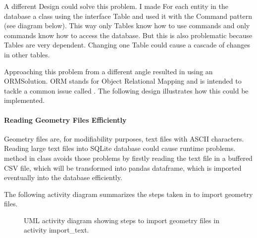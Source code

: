 \documentclass[letterpaper,10pt,english]{sphinxmanual}
\begin{document}
A different Design could solve this problem. I made For each entity in the database a class using the interface Table and used it with the Command pattern (see diagram below). This way only Tables know how to use commands and only commands know how to access the database. But this is also problematic because Tables are very dependent. Changing one Table could cause a cascade of changes in other tables.

\begin{figure}[htbp]
\centering

\noindent{}
\end{figure}

Approaching this problem from a different angle resulted in using an ORM\sphinxhyphen{}Solution. ORM stands for Object Relational Mapping and is intended to tackle a common issue called .
The following design illustrates how this could be implemented.

\begin{figure}[htbp]
\centering

\noindent{}
\end{figure}


\paragraph{Reading Geometry Files Efficiently}
\label{\detokenize{implementation:reading-geometry-files-efficiently}}
Geometry files are, for modifiability purposes, text files with ASCII characters.
Reading large text files into SQLite database could cause run\sphinxhyphen{}time problems.
 method in  class avoids those problems by firstly reading the text file in a buffered CSV file,
which will be transformed into pandas dataframe, which is imported eventually into the database efficiently.

The following activity diagram summarizes the steps taken in  to import geometry files.

\begin{figure}[htbp]
\centering
\capstart

\noindent{}
\caption{UML activity diagram showing steps to import geometry files in activity import\_text.}\label{\detokenize{implementation:id2}}\end{figure}
\end{document}
